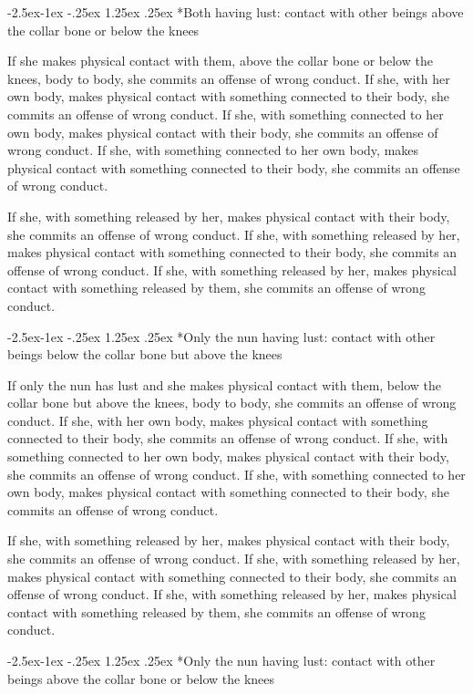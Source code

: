 \documentclass[12pt,openany]{book}%
\makeatletter
\renewcommand\subparagraph{\@startsection{subparagraph}{5}{\z@}%
            {-2.5ex\@plus -1ex \@minus -.25ex}%
            {1.25ex \@plus .25ex}%
            {\noindent\normalfont\itshape\footnotesize}}
\makeatother
\begin{document}
\subparagraph*{Both having lust: contact with other beings above the collar bone or below the knees }

If she makes physical contact with them, above the collar bone or below the knees, body to body, she commits an offense of wrong conduct. If she, with her own body, makes physical contact with something connected to their body, she commits an offense of wrong conduct. If she, with something connected to her own body, makes physical contact with their body, she commits an offense of wrong conduct. If she, with something connected to her own body, makes physical contact with something connected to their body, she commits an offense of wrong conduct. 

If she, with something released by her, makes physical contact with their body, she commits an offense of wrong conduct. If she, with something released by her, makes physical contact with something connected to their body, she commits an offense of wrong conduct. If she, with something released by her, makes physical contact with something released by them, she commits an offense of wrong conduct. 

\subparagraph*{Only the nun having lust: contact with other beings below the collar bone but above the knees }

If only the nun has lust and she makes physical contact with them, below the collar bone but above the knees, body to body, she commits an offense of wrong conduct. If she, with her own body, makes physical contact with something connected to their body, she commits an offense of wrong conduct. If she, with something connected to her own body, makes physical contact with their body, she commits an offense of wrong conduct. If she, with something connected to her own body, makes physical contact with something connected to their body, she commits an offense of wrong conduct. 

If she, with something released by her, makes physical contact with their body, she commits an offense of wrong conduct. If she, with something released by her, makes physical contact with something connected to their body, she commits an offense of wrong conduct. If she, with something released by her, makes physical contact with something released by them, she commits an offense of wrong conduct. 

\subparagraph*{Only the nun having lust: contact with other beings above the collar bone or below the knees }
\end{document}
